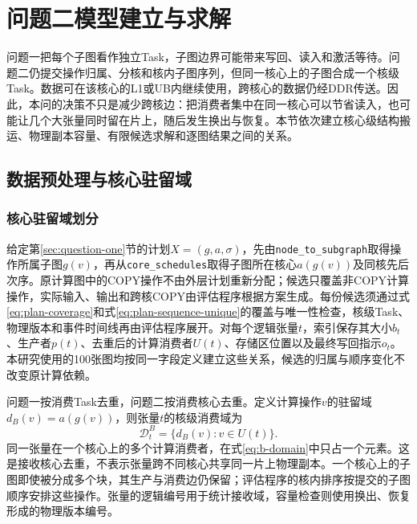 \section{问题二模型建立与求解}
\label{sec:question-two}

问题一把每个子图看作独立Task，子图边界可能带来写回、读入和激活等待。问题二仍提交操作归属、分核和核内子图序列，但同一核心上的子图合成一个核级Task。数据可在该核心的L1或UB内继续使用，跨核心的数据仍经DDR传送。因此，本问的决策不只是减少跨核边：把消费者集中在同一核心可以节省读入，也可能让几个大张量同时留在片上，随后发生换出与恢复。本节依次建立核心级结构搬运、物理副本容量、有限候选求解和逐图结果之间的关系。

\subsection{数据预处理与核心驻留域}
\subsubsection{核心驻留域划分}
给定第\ref{sec:question-one}节的计划$X=(g,a,\sigma)$，先由\texttt{node\_to\_subgraph}取得操作所属子图$g(v)$，再从\texttt{core\_schedules}取得子图所在核心$a(g(v))$及同核先后次序。原计算图中的COPY操作不由外层计划重新分配；候选只覆盖非COPY计算操作，实际输入、输出和跨核COPY由评估程序根据方案生成。每份候选须通过式\eqref{eq:plan-coverage}和式\eqref{eq:plan-sequence-unique}的覆盖与唯一性检查，核级Task、物理版本和事件时间线再由评估程序展开。对每个逻辑张量$t$，索引保存其大小$b_t$、生产者$p(t)$、去重后的计算消费者$U(t)$、存储区位置以及最终写回指示$o_t$。本研究使用的100张图均按同一字段定义建立这些关系，候选的归属与顺序变化不改变原计算依赖。

问题一按消费Task去重，问题二按消费核心去重。定义计算操作$v$的驻留域$d_B(v)=a(g(v))$，则张量$t$的核级消费域为
\begin{equation}
\mathcal D_t^B=\{d_B(v):v\in U(t)\}.
\label{eq:b-domain}
\end{equation}
同一张量在一个核心上的多个计算消费者，在式\eqref{eq:b-domain}中只占一个元素。这是接收核心去重，不表示张量跨不同核心共享同一片上物理副本。一个核心上的子图即使被分成多个块，其生产与消费边仍保留；评估程序的核内排序按提交的子图顺序安排这些操作。张量的逻辑编号用于统计接收域，容量检查则使用换出、恢复形成的物理版本编号。

